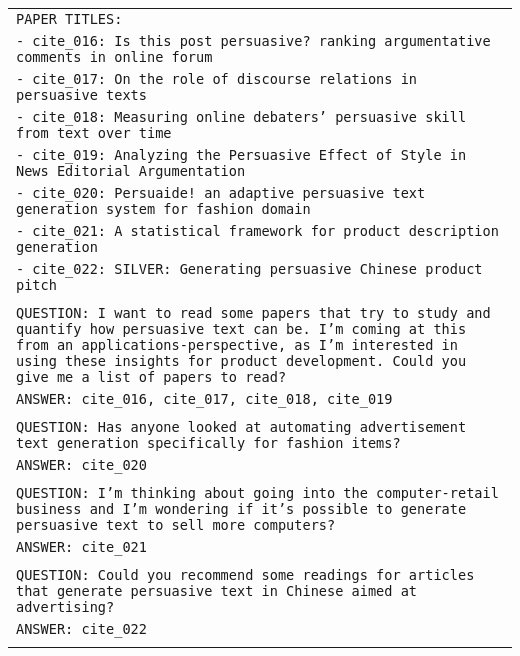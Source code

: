 \begin{table*}[ht]
\begin{tabular}{>{\raggedright\arraybackslash\tt}p{}<{}}
            PAPER TITLES: \\
            - cite\_016: Is this post persuasive? ranking argumentative comments in online forum \\
            - cite\_017: On the role of discourse relations in persuasive texts \\
            - cite\_018: Measuring online debaters' persuasive skill from text over time \\
            - cite\_019: Analyzing the Persuasive Effect of Style in News Editorial Argumentation \\
            - cite\_020: Persuaide! an adaptive persuasive text generation system for fashion domain \\
            - cite\_021: A statistical framework for product description generation \\
            - cite\_022: SILVER: Generating persuasive Chinese product pitch \\
            \\

            QUESTION: I want to read some papers that try to study and quantify how persuasive text can be. I'm coming at this from an applications-perspective, as I'm interested in using these insights for product development. Could you give me a list of papers to read? \\
            ANSWER: cite\_016, cite\_017, cite\_018, cite\_019 \\ \\

            QUESTION: Has anyone looked at automating advertisement text generation specifically for fashion items? \\
            ANSWER: cite\_020 \\ \\

            QUESTION: I'm thinking about going into the computer-retail business and I'm wondering if it's possible to generate persuasive text to sell more computers? \\
            ANSWER: cite\_021 \\ \\

            QUESTION: Could you recommend some readings for articles that generate persuasive text in Chinese aimed at advertising? \\ 
            ANSWER: cite\_022 \\ \\


\end{tabular}
\end{table*}
